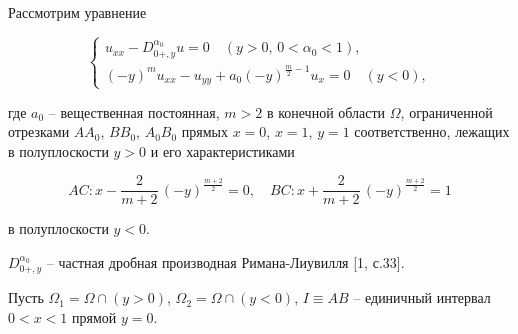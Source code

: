


Рассмотрим уравнение

\begin{equation}

       \label{eq1}

\left\{ {\begin{array} {l}

u_{xx}-D_{0+,y}^{\alpha_{0}} u=0 \quad (y>0,\, 0<\alpha_{0}<1), \\

(-y)^{m} u_{xx}-u_{yy}+a_{0} (-y)^{\frac{m}{2}-1}u_{x}=0 \quad (y<0),

\end{array}} \right.

\end{equation}

где $a_{0}$ -- вещественная постоянная, $m>2$ в конечной области $\Omega$, ограниченной отрезками $AA_{0}$, $BB_{0}$, $A_{0}B_{0}$ прямых $x=0$, $x=1$, $y=1$ соответственно, лежащих в полуплоскости $y>0$ и его характеристиками

\[

AC : x-\frac{2}{m+2} \, (-y)^{\frac{m+2}{2}}=0, \quad  BC: x+\frac{2}{m+2} \, (-y)^{\frac{m+2}{2}}=1

\]

в полуплоскости $y<0$.



$D_{0+,y}^{\alpha_{0}}$ -- частная дробная производная Римана-Лиувилля [1, с.33].



Пусть $\Omega_{1}= \Omega \cap (y>0)$, $\Omega_{2}= \Omega \cap (y<0)$, $I \equiv AB$ -- единичный интервал $0<x<1$ прямой $y=0$.



